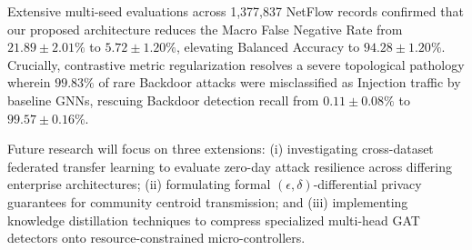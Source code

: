 \documentclass[journal,onecolumn]{IEEEtran}
\begin{document}
Extensive multi-seed evaluations across 1,377,837 NetFlow records confirmed that our proposed architecture reduces the Macro False Negative Rate from $21.89 \pm 2.01\%$ to $5.72 \pm 1.20\%$, elevating Balanced Accuracy to $94.28 \pm 1.20\%$. Crucially, contrastive metric regularization resolves a severe topological pathology wherein $99.83\%$ of rare Backdoor attacks were misclassified as Injection traffic by baseline GNNs, rescuing Backdoor detection recall from $0.11 \pm 0.08\%$ to $99.57 \pm 0.16\%$.

Future research will focus on three extensions: (i) investigating cross-dataset federated transfer learning to evaluate zero-day attack resilience across differing enterprise architectures; (ii) formulating formal $(\epsilon, \delta)$-differential privacy guarantees for community centroid transmission; and (iii) implementing knowledge distillation techniques to compress specialized multi-head GAT detectors onto resource-constrained micro-controllers.
\end{document}
